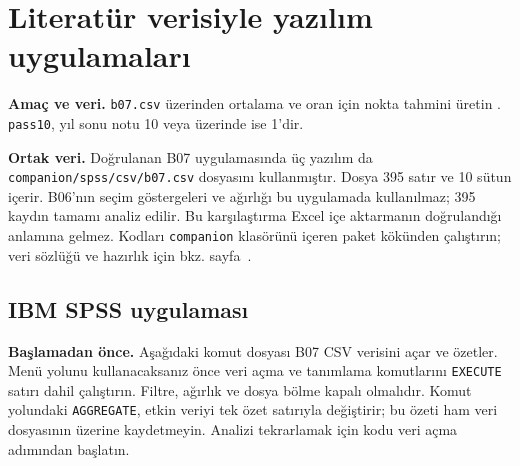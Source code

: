 \section{Literatür verisiyle yazılım uygulamaları}
\label{sec:spss-b07}

\textbf{Amaç ve veri.} \texttt{b07.csv} üzerinden ortalama ve oran için
nokta tahmini üretin \citep{cortez2008data}. \texttt{pass10}, yıl sonu notu
10 veya üzerinde ise 1'dir.

\textbf{Ortak veri.} Doğrulanan B07 uygulamasında üç yazılım da
\nolinkurl{companion/spss/csv/b07.csv} dosyasını kullanmıştır. Dosya
395 satır ve 10 sütun içerir. B06'nın seçim göstergeleri ve ağırlığı bu
uygulamada kullanılmaz; 395 kaydın tamamı analiz edilir. Bu karşılaştırma
Excel içe aktarmanın doğrulandığı anlamına gelmez. Kodları
\texttt{companion} klasörünü içeren paket kökünden çalıştırın;
veri sözlüğü ve hazırlık için bkz. sayfa~\pageref{sec:spss-guide}.

\subsection{IBM SPSS uygulaması}
\textbf{Başlamadan önce.} Aşağıdaki komut dosyası B07 CSV verisini
açar ve özetler. Menü yolunu kullanacaksanız önce veri açma ve tanımlama
komutlarını \texttt{EXECUTE} satırı dahil çalıştırın. Filtre, ağırlık ve
dosya bölme kapalı olmalıdır. Komut yolundaki \texttt{AGGREGATE}, etkin
veriyi tek özet satırıyla değiştirir; bu özeti ham veri dosyasının üzerine
kaydetmeyin. Analizi tekrarlamak için kodu veri açma adımından başlatın.

\begin{spssadimlar}
\end{spssadimlar}

